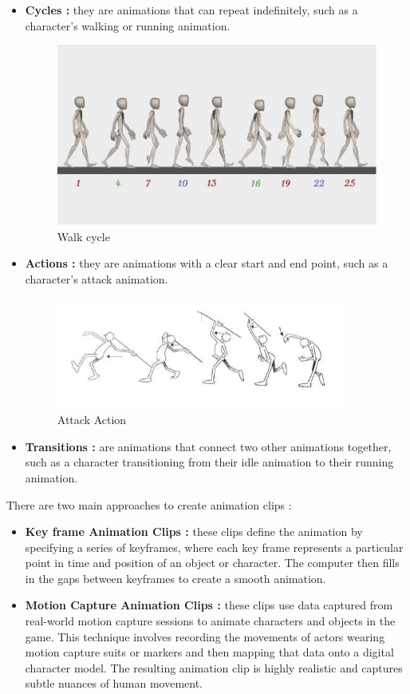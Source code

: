 \documentclass[12pt]{book}
\begin{document}
\begin{itemize}
    \item \textbf {Cycles : }they are animations that can repeat indefinitely, such as a character's walking or running animation.
          \begin{figure}[h!]
              \centering
              \includegraphics[scale=1]{Figures/Images/walk cycle animation exemple.PNG}
              \caption{Walk cycle}
          \end{figure}
    \item \textbf {Actions : }they are animations with a clear start and end point, such as a character's attack animation.
          \begin{figure}[h!]
              \centering
              \includegraphics[scale=1]{Figures/Images/attack action exemple.png}
              \caption{Attack Action}
          \end{figure}
    \item \textbf {Transitions : }are animations that connect two other animations together, such as a character transitioning from their idle animation to their running animation.
\end{itemize}
There are two main approaches to create animation clips :
\begin{itemize}
    \item \textbf{Key frame Animation Clips :}
          these clips define the animation by specifying a series of keyframes, where each key frame represents a particular point in time
          and position of an object or character. The computer then fills in the gaps between keyframes to create a smooth animation.
    \item \textbf{Motion Capture Animation Clips :}
          these clips use data captured from real-world motion capture sessions to animate characters and objects in the game.
          This technique involves recording the movements of actors wearing motion capture suits or markers and then mapping that data
          onto a digital character model. The resulting animation clip is highly realistic and captures subtle nuances of human movement.
\end{itemize}
\end{document}
